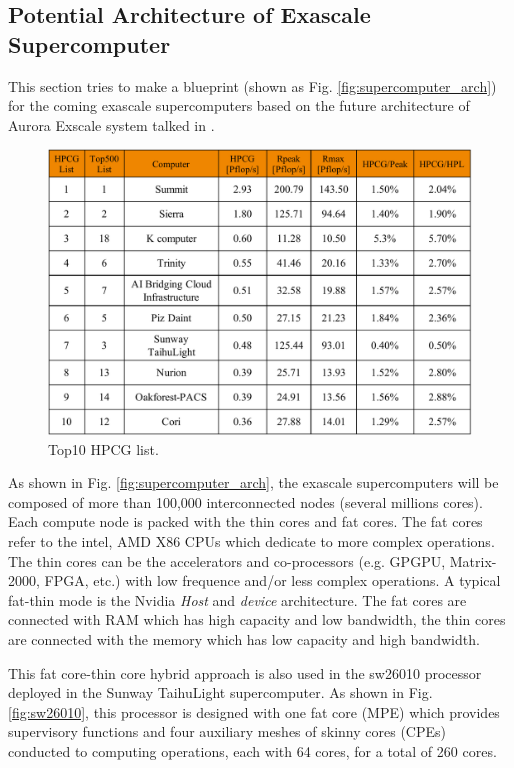 \subsection{Potential Architecture of Exascale Supercomputer} \label{Potential Architecture of Exascale Supercomputer}

This section tries to make a blueprint (shown as Fig. \ref{fig:supercomputer_arch}) for the coming exascale supercomputers based on the future architecture of Aurora Exscale system talked in \cite{TheNextPlatform}.

\begin{figure}[htbp]
	\centering
	\includegraphics[width=6.2in]{fig/top500_hpcg.pdf}
	\caption{Top10 HPCG list.}
	\label{top500-hpxg}
\end{figure}


As shown in Fig. \ref{fig:supercomputer_arch}, the exascale supercomputers will be composed of more than 100,000 interconnected nodes (several millions cores). Each compute node is packed with the thin cores and fat cores. The fat cores refer to the intel, AMD X86 CPUs which dedicate to more complex operations. The thin cores can be the accelerators and co-processors (e.g. GPGPU, Matrix-2000, FPGA, etc.) with low frequence and/or less complex operations. A typical fat-thin mode is the Nvidia \textit{Host} and \textit{device} architecture. The fat cores are connected with RAM which has high capacity and low bandwidth, the thin cores are connected with the memory which has low capacity and high bandwidth.

This fat core-thin core hybrid approach is also used in the sw26010 processor deployed in the Sunway TaihuLight supercomputer. As shown in Fig. \ref{fig:sw26010}, this processor is designed with one fat core (MPE) which provides supervisory functions and four auxiliary meshes of skinny cores  (CPEs) conducted to computing operations, each with 64 cores, for a total of 260 cores.

